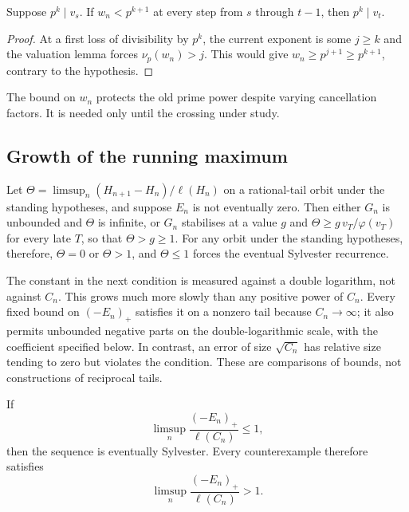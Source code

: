 \documentclass[11pt]{article}
\begin{document}
\begin{corollary}\label{long243:res:powerpersistence}
Suppose $p^k\mid v_s$. If $w_n<p^{k+1}$ at every step from $s$ through
$t-1$, then $p^k\mid v_t$.
\end{corollary}
\begin{proof}
At a first loss of divisibility by $p^k$, the current exponent is some
$j\ge k$ and the valuation lemma forces $\nu_p(w_n)>j$. This would give
$w_n\ge p^{j+1}\ge p^{k+1}$, contrary to the hypothesis.
\end{proof}
The bound on $w_n$ protects the old prime power despite varying
cancellation factors. It is needed only until the crossing under study.

\subsection{Growth of the running maximum}

\begin{theorem}\label{long243:res:recorddichotomy}
Let $\Theta=\limsup_n(H_{n+1}-H_n)/\ell(H_n)$ on a rational-tail orbit
under the standing hypotheses, and suppose $E_n$ is not eventually zero.
Then either $G_n$ is unbounded and $\Theta$ is infinite, or
$G_n$ stabilises at a value $g$ and $\Theta\ge g\,v_T/\varphi(v_T)$ for every
late $T$, so that $\Theta>g\ge1$.  For any orbit under the standing
hypotheses, therefore, $\Theta=0$ or $\Theta>1$, and $\Theta\le1$ forces
the eventual Sylvester recurrence.
\end{theorem}

The constant in the next condition is measured against a double
logarithm, not against $C_n$. This grows much more slowly than any
positive power of $C_n$. Every fixed bound on $(-E_n)_+$ satisfies
it on a nonzero tail because $C_n\to\infty$; it also permits unbounded
negative parts on the double-logarithmic scale, with the coefficient
specified below. In contrast, an error of size
$\sqrt{C_n}$ has relative size tending to zero but violates the condition.
These are comparisons of bounds, not constructions of reciprocal tails.

\begin{corollary}\label{long243:res:loglogboundary}
If
\[
 \limsup_n\frac{(-E_n)_+}{\ell(C_n)}\le1,
\]
then the sequence is eventually Sylvester. Every counterexample therefore
satisfies
\[
 \limsup_n\frac{(-E_n)_+}{\ell(C_n)}>1.
\]
\end{corollary}
\end{document}
